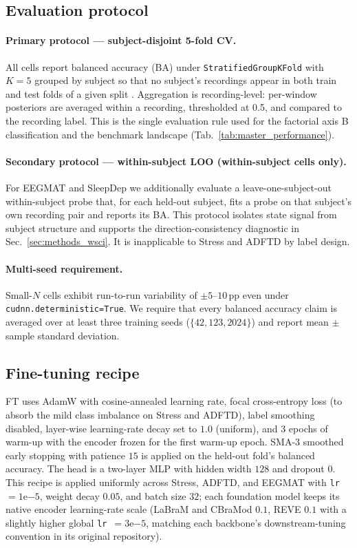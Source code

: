 \subsection{Evaluation protocol}
\label{sec:methods_eval}

\paragraph{Primary protocol --- subject-disjoint 5-fold CV.} All
cells report balanced accuracy (BA) under
\texttt{StratifiedGroupKFold} with $K=5$ grouped by subject so that no
subject's recordings appear in both train and test folds of a given
split \citep{brookshire2024leakage}. Aggregation is recording-level:
per-window posteriors are averaged within a recording, thresholded at
0.5, and compared to the recording label. This is the single
evaluation rule used for the factorial axis B classification and the
benchmark landscape (Tab.~\ref{tab:master_performance}).

\paragraph{Secondary protocol --- within-subject LOO (within-subject
cells only).} For EEGMAT and SleepDep we additionally evaluate a
leave-one-subject-out within-subject probe that, for each held-out
subject, fits a probe on that subject's own recording pair and
reports its BA. This protocol isolates state signal from subject
structure and supports the direction-consistency diagnostic in
Sec.~\ref{sec:methods_wsci}. It is inapplicable to Stress and ADFTD
by label design.

\paragraph{Multi-seed requirement.} Small-$N$ cells exhibit run-to-run
variability of $\pm 5$--$10$\,pp even under
\texttt{cudnn.deterministic=True}. We require that every balanced
accuracy claim is averaged over at least three training seeds
($\{42, 123, 2024\}$) and report mean $\pm$ sample standard deviation.

\subsection{Fine-tuning recipe}
\label{sec:methods_ft}

FT uses AdamW with cosine-annealed learning rate, focal cross-entropy
loss (to absorb the mild class imbalance on Stress and ADFTD), label
smoothing disabled, layer-wise learning-rate decay set to $1.0$
(uniform), and $3$ epochs of warm-up with the encoder frozen for the
first warm-up epoch. SMA-$3$ smoothed early stopping with patience
$15$ is applied on the held-out fold's balanced accuracy. The head is
a two-layer MLP with hidden width $128$ and dropout $0$. This recipe
is applied uniformly across Stress, ADFTD, and EEGMAT with
\texttt{lr}~$=1\mathrm{e}{-5}$, weight decay $0.05$, and batch size
$32$; each foundation model keeps its native encoder learning-rate
scale (LaBraM and CBraMod $0.1$, REVE $0.1$ with a slightly higher
global \texttt{lr}~$=3\mathrm{e}{-5}$, matching each backbone's
downstream-tuning convention in its original repository).

